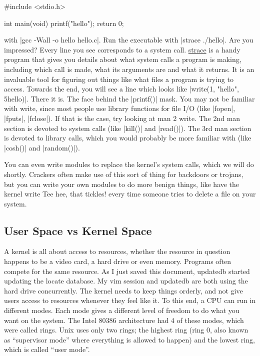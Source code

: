 \documentclass[10pt, oneside]{book}
\begin{document}
\begin{code}
#include <stdio.h>

int main(void)
{
    printf("hello");
    return 0;
}
\end{code}

with \sh|gcc -Wall -o hello hello.c|.
Run the executable with \sh|strace ./hello|.
Are you impressed?
Every line you see corresponds to a system call.
\href{https://strace.io/}{strace} is a handy program that gives you details about what system calls a program is making, including which call is made, what its arguments are and what it returns.
It is an invaluable tool for figuring out things like what files a program is trying to access.
Towards the end, you will see a line which looks like \cpp|write(1, "hello", 5hello)|.
There it is.
The face behind the \cpp|printf()| mask.
You may not be familiar with write, since most people use library functions for file I/O (like \cpp|fopen|, \cpp|fputs|, \cpp|fclose|).
If that is the case, try looking at man 2 write.
The 2nd man section is devoted to system calls (like \cpp|kill()| and \cpp|read()|).
The 3rd man section is devoted to library calls, which you would probably be more familiar with (like \cpp|cosh()| and \cpp|random()|).

You can even write modules to replace the kernel's system calls, which we will do shortly.
Crackers often make use of this sort of thing for backdoors or trojans, but you can write your own modules to do more benign things, like have the kernel write Tee hee, that tickles! every time someone tries to delete a file on your system.

\subsection{User Space vs Kernel Space}
\label{sec:user_kernl_space}
A kernel is all about access to resources, whether the resource in question happens to be a video card, a hard drive or even memory.
Programs often compete for the same resource. As I just saved this document, updatedb started updating the locate database.
My vim session and updatedb are both using the hard drive concurrently.
The kernel needs to keep things orderly, and not give users access to resources whenever they feel like it.
To this end, a CPU can run in different modes.
Each mode gives a different level of freedom to do what you want on the system.
The Intel 80386 architecture had 4 of these modes, which were called rings. Unix uses only two rings; the highest ring (ring 0, also known as ``supervisor mode'' where everything is allowed to happen) and the lowest ring, which is called ``user mode''.
\end{document}
